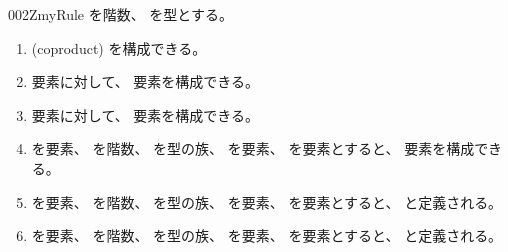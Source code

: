 \documentclass[index]{subfiles}
\begin{document}
\begin{myBlock}{002Z}{myRule}
  を階数、
  を型とする。
  \begin{enumerate}
  \item {}(coproduct)
    を構成できる。
  \item 要素に対して、
    要素を構成できる。
  \item 要素に対して、
    要素を構成できる。
  \item {}を要素、
    を階数、
    を型の族、
    を要素、
    を要素とすると、
    要素を構成できる。
  \item {}を要素、
    を階数、
    を型の族、
    を要素、
    を要素とすると、
    と定義される。
  \item {}を要素、
    を階数、
    を型の族、
    を要素、
    を要素とすると、
    と定義される。
    \end{enumerate}
\end{myBlock}
\end{document}
